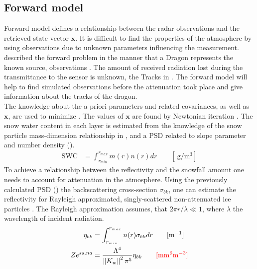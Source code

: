 \subsection{Forward model}\label{sec:forward_model}

Forward model defines a relationship between the radar observations and the retrieved state vector $\mathbf{x}$. It is difficult to find the properties of the atmosphere by using observations due to unknown parameters influencing the measurement. \\
\cite{stephens_remote_1994} described the forward problem in the manner that a Dragon represents the known source, observations . The amount of received radiation lost during the transmittance to the sensor is unknown, the Tracks in . The forward model will help to find simulated observations before the attenuation took place and give information about the tracks of the dragon.  
\\
The knowledge about the a priori parameters and related covariances, as well as $\mathbf{x}$, are used to minimize . The values of $\mathbf{x}$ are found by Newtonian iteration \cite[Eq. 5]{wood_estimating_2014}.
\newline
The snow water content in each layer is estimated from the knowledge of the snow particle mass-dimension relationship in , and a PSD related to slope parameter and number density (). %
\begin{align}
	\text{SWC} & = \int_{r_{min}}^{r_{max}} m(r) n(r) dr \qquad [\SI{}{\gram\per\cubic\metre}] \label{eq:SWC}
\end{align}
To achieve a relationship between the reflectivity and the snowfall amount one needs to account for attenuation in the atmosphere. Using the previously calculated PSD () the backscattering cross-section $\sigma_{bk}$, one can estimate the reflectivity for Rayleigh approximated, singly-scattered non-attenuated ice particles \citep{lecuyer_estimation-based_2002,kulie_utilizing_2009,wood_microphysical_2015}. The Rayleigh approximation assumes, that $2\pi r/\lambda \ll 1$, where $\lambda$ the wavelength of incident radiation.
\begin{align}
	\eta_{bk} & = \int_{r_{min}}^{r_{max}} n(r) \sigma_{bk} dr \qquad [\SI{}{\per\metre}] \nonumber \\
	Ze^{ss,na} & = \frac{\Lambda^4}{\left\| K_w \right\|^2 \pi^5} \eta_{bk} \qquad \textcolor{red}{[\SI{}{\mm^6\metre^{-3}}]} \label{eq:singleZ}
\end{align}
